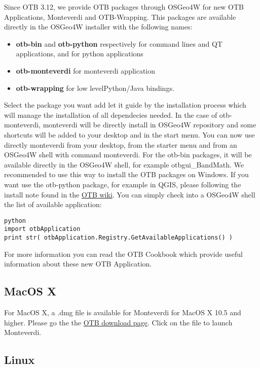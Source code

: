 Since OTB 3.12, we provide OTB packages through OSGeo4W for new OTB Applications, Monteverdi and 
OTB-Wrapping. This packages are available directly in the OSGeo4W installer with the following names:
\begin{itemize}
\item \textbf{otb-bin} and \textbf{otb-python} respectively for command lines and QT applications, and for python applications
\item \textbf{otb-monteverdi} for monteverdi application 
\item \textbf{otb-wrapping} for low levelPython/Java bindings.
\end{itemize}
Select the package you want add let it guide by the installation process which will manage the installation of all dependecies needed.
In the case of otb-monteverdi, monteverdi will be directly install in OSGeo4W repository and some shortcuts will be added to your desktop 
and in the start menu. You can now use directly monteverdi from your desktop, from the starter menu and from an OSGeo4W shell with command monteverdi. 
For the otb-bin packages, it will be available directly in the OSGeo4W shell, for example otbgui\_BandMath. We recommended to use this way to install 
the OTB packages on Windows. 
If you want use the otb-python package, for example in QGIS, please following the install note found in the \href{http://wiki.orfeo-toolbox.org/index.php/Quantum_GIS_access_to_OTB_applications#Notes_for_Windows_users}{OTB wiki}. You can simply check into a OSGeo4W shell the list of available application:
\begin{verbatim}
python
import otbApplication
print str( otbApplication.Registry.GetAvailableApplications() )
\end{verbatim}
For more information you can read the OTB Cookbook which provide useful information about these new OTB Application. 

\subsection{MacOS X}
\label{ssec:mac_binaries}

For MacOS X, a .dmg file is available for Monteverdi for MacOS X 10.5 and higher. 
Please go the the \href{http://sourceforge.net/projects/orfeo-toolbox/}{OTB download page}.
Click on the file to launch Monteverdi.

\subsection{Linux}

